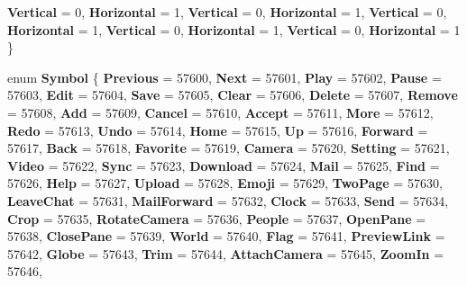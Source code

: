 \begin{DoxyCompactItemize}
{\bfseries Vertical} = 0, 
{\bfseries Horizontal} = 1, 
{\bfseries Vertical} = 0, 
{\bfseries Horizontal} = 1, 
\newline
{\bfseries Vertical} = 0, 
{\bfseries Horizontal} = 1, 
{\bfseries Vertical} = 0, 
{\bfseries Horizontal} = 1, 
\newline
{\bfseries Vertical} = 0, 
{\bfseries Horizontal} = 1
 \}
\item 
\mbox{\label{namespace_windows_1_1_u_i_1_1_xaml_1_1_controls_ab2786e53a8f4a8379dca4f44df7d4497}} 
enum {\bfseries Symbol} \{ \newline
{\bfseries Previous} = 57600, 
{\bfseries Next} = 57601, 
{\bfseries Play} = 57602, 
{\bfseries Pause} = 57603, 
\newline
{\bfseries Edit} = 57604, 
{\bfseries Save} = 57605, 
{\bfseries Clear} = 57606, 
{\bfseries Delete} = 57607, 
\newline
{\bfseries Remove} = 57608, 
{\bfseries Add} = 57609, 
{\bfseries Cancel} = 57610, 
{\bfseries Accept} = 57611, 
\newline
{\bfseries More} = 57612, 
{\bfseries Redo} = 57613, 
{\bfseries Undo} = 57614, 
{\bfseries Home} = 57615, 
\newline
{\bfseries Up} = 57616, 
{\bfseries Forward} = 57617, 
{\bfseries Back} = 57618, 
{\bfseries Favorite} = 57619, 
\newline
{\bfseries Camera} = 57620, 
{\bfseries Setting} = 57621, 
{\bfseries Video} = 57622, 
{\bfseries Sync} = 57623, 
\newline
{\bfseries Download} = 57624, 
{\bfseries Mail} = 57625, 
{\bfseries Find} = 57626, 
{\bfseries Help} = 57627, 
\newline
{\bfseries Upload} = 57628, 
{\bfseries Emoji} = 57629, 
{\bfseries Two\+Page} = 57630, 
{\bfseries Leave\+Chat} = 57631, 
\newline
{\bfseries Mail\+Forward} = 57632, 
{\bfseries Clock} = 57633, 
{\bfseries Send} = 57634, 
{\bfseries Crop} = 57635, 
\newline
{\bfseries Rotate\+Camera} = 57636, 
{\bfseries People} = 57637, 
{\bfseries Open\+Pane} = 57638, 
{\bfseries Close\+Pane} = 57639, 
\newline
{\bfseries World} = 57640, 
{\bfseries Flag} = 57641, 
{\bfseries Preview\+Link} = 57642, 
{\bfseries Globe} = 57643, 
\newline
{\bfseries Trim} = 57644, 
{\bfseries Attach\+Camera} = 57645, 
{\bfseries Zoom\+In} = 57646, 

\end{DoxyCompactItemize}

